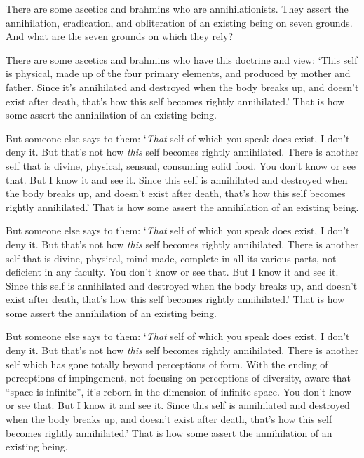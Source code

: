 \documentclass[12pt,openany]{book}%
\begin{document}
There are some ascetics and brahmins who are annihilationists. They assert the annihilation, eradication, and obliteration of an existing being on seven grounds. And what are the seven grounds on which they rely? 

There are some ascetics and brahmins who have this doctrine and view: ‘This self is physical, made up of the four primary elements, and produced by mother and father. Since it’s annihilated and destroyed when the body breaks up, and doesn’t exist after death, that’s how this self becomes rightly annihilated.’ That is how some assert the annihilation of an existing being. 

But someone else says to them: ‘\emph{That} self of which you speak does exist, I don’t deny it. But that’s not how \emph{this} self becomes rightly annihilated. There is another self that is divine, physical, sensual, consuming solid food. You don’t know or see that. But I know it and see it. Since this self is annihilated and destroyed when the body breaks up, and doesn’t exist after death, that’s how this self becomes rightly annihilated.’ That is how some assert the annihilation of an existing being. 

But someone else says to them: ‘\emph{That} self of which you speak does exist, I don’t deny it. But that’s not how \emph{this} self becomes rightly annihilated. There is another self that is divine, physical, mind-made, complete in all its various parts, not deficient in any faculty. You don’t know or see that. But I know it and see it. Since this self is annihilated and destroyed when the body breaks up, and doesn’t exist after death, that’s how this self becomes rightly annihilated.’ That is how some assert the annihilation of an existing being. 

But someone else says to them: ‘\emph{That} self of which you speak does exist, I don’t deny it. But that’s not how \emph{this} self becomes rightly annihilated. There is another self which has gone totally beyond perceptions of form. With the ending of perceptions of impingement, not focusing on perceptions of diversity, aware that “space is infinite”, it’s reborn in the dimension of infinite space. You don’t know or see that. But I know it and see it. Since this self is annihilated and destroyed when the body breaks up, and doesn’t exist after death, that’s how this self becomes rightly annihilated.’ That is how some assert the annihilation of an existing being. 
\end{document}

